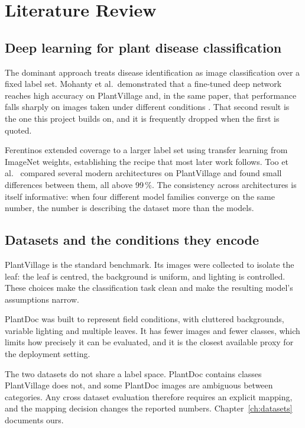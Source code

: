 
\chapter{Literature Review}
\label{ch:literature}

\section{Deep learning for plant disease classification}

The dominant approach treats disease identification as image classification over a
fixed label set. Mohanty et al.\ demonstrated that a fine-tuned deep network reaches
high accuracy on PlantVillage and, in the same paper, that performance falls sharply
on images taken under different conditions \cite{mohanty2016}. That second result is
the one this project builds on, and it is frequently dropped when the first is
quoted.

Ferentinos \cite{ferentinos2018} extended coverage to a larger label set using
transfer learning from ImageNet weights, establishing the recipe that most later
work follows. Too et al.\ \cite{too2019} compared several modern architectures on
PlantVillage and found small differences between them, all above 99\,\%. The
consistency across architectures is itself informative: when four different model
families converge on the same number, the number is describing the dataset more than
the models.

\section{Datasets and the conditions they encode}

PlantVillage \cite{hughes2015} is the standard benchmark. Its images were collected
to isolate the leaf: the leaf is centred, the background is uniform, and lighting is
controlled. These choices make the classification task clean and make the resulting
model's assumptions narrow.

PlantDoc \cite{singh2020} was built to represent field conditions, with cluttered
backgrounds, variable lighting and multiple leaves. It has fewer images and fewer
classes, which limits how precisely it can be evaluated, and it is the closest
available proxy for the deployment setting.

The two datasets do not share a label space. PlantDoc contains classes PlantVillage
does not, and some PlantDoc images are ambiguous between categories. Any cross
dataset evaluation therefore requires an explicit mapping, and the mapping decision
changes the reported numbers. Chapter~\ref{ch:datasets} documents ours.

